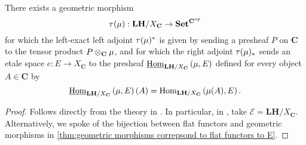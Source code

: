 \begin{proposition}
\label{prop:the geometric morphism induced by ST}
There exists a geometric morphism
\[ \tau(\operatorname{\mu}) : \mathbf{LH}/X_{\mathbf{C}} \to \mathbf{Set}^{\mathbf{C}^{op}} \]
for which the left-exact left adjoint $\tau(\operatorname{\mu})^*$ is given by sending a presheaf $P$ on $\mathbf{C}$ to the tensor product $P \otimes_{\mathbf{C}} \operatorname{\mu}$, and for which the right adjoint $\tau(\operatorname{\mu})_*$ sends an etale space $e : E \to X_{\mathbf{C}}$ to the presheaf $\underline{\operatorname{Hom}}_{\mathbf{LH}/X_{\mathbf{C}}}\left(\operatorname{\mu}, E\right)$ defined for every object $A \in \mathbf{C}$ by
\[ \underline{\operatorname{Hom}}_{\mathbf{LH}/X_{\mathbf{C}}}\left(\operatorname{\mu}, E \right)(A) = \operatorname{Hom}_{\mathbf{LH}/X_{\mathbf{C}}}\left(\operatorname{\mu}(A), E \right). \]
\end{proposition}
\begin{proof}
Follows directly from the theory in \cite[Chapter VII, Paragraph 7]{MacLaneMoerdijk91}. In particular, in \cite[Theorem VII.7.2]{MacLaneMoerdijk91}, take $\mathscr{E} = \mathbf{LH}/X_{\mathbf{C}}$. Alternatively, we spoke of the bijection between flat functors and geometric morphisms in \cref{thm:geometric morphisms correpsond to flat functors to E}.
\end{proof}

 

